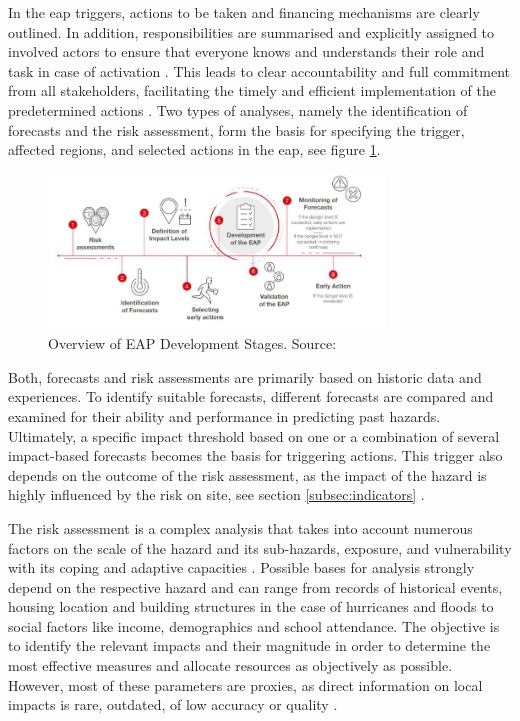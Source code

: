 In the \acrfull{eap} triggers, actions to be taken and financing mechanisms are clearly outlined. In addition, responsibilities are summarised and explicitly assigned to involved actors to ensure that everyone knows and understands their role and task in case of activation \autocite{ruthForecastbasedFinancingPolicy2017}. This leads to clear accountability and full commitment from all stakeholders, facilitating the timely and efficient implementation of the predetermined actions \autocite{ruthForecastbasedFinancingPolicy2017}.\newline
Two types of analyses, namely the identification of forecasts and the risk assessment, form the basis for specifying the trigger, affected regions, and selected actions in the \acrshort{eap}, see figure \ref{fig:th_eap_dev}. 

\begin{figure}[!htp]
    \centering
    \includegraphics[width=0.8\textwidth]{figures/2023_MA_th_eap_validation_steps.jpg}
    \decoRule
    \caption[Overview of EAP Development Stages]{Overview of EAP Development Stages. Source: \textcite{grc2ndAfricanDialogue2019}}
    \label{fig:th_eap_dev}
\end{figure}

Both, forecasts and risk assessments are primarily based on historic data and experiences. To identify suitable forecasts, different forecasts are compared and examined for their ability and performance in predicting past hazards. Ultimately, a specific impact threshold based on one or a combination of several impact-based forecasts becomes the basis for triggering actions. This trigger also depends on the outcome of the risk assessment, as the impact of the hazard is highly influenced by the risk on site, see section \ref{subsec:indicators} \autocite{ifrcFbFPractitionersManual2023,ifrcForecastbasedFinancingNew2019}.

The risk assessment is a complex analysis that takes into account numerous factors on the scale of the hazard and its sub-hazards, exposure, and vulnerability with its coping and adaptive capacities \autocite{ifrcFbFPractitionersManual2023}. Possible bases for analysis strongly depend on the respective hazard and can range from records of historical events, housing location and building structures in the case of hurricanes and floods to social factors like income, demographics and school attendance. The objective is to identify the relevant impacts and their magnitude in order to determine the most effective measures and allocate resources as objectively as possible. However, most of these parameters are proxies, as direct information on local impacts is rare, outdated, of low accuracy or quality \autocite{ifrcFbFPractitionersManual2023}.

